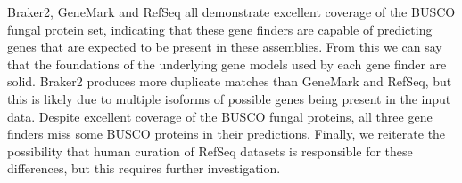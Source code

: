 
Braker2, GeneMark and RefSeq all demonstrate excellent coverage of the
BUSCO fungal protein set, indicating that these gene finders are
capable of predicting genes that are expected to be present in these
assemblies. From this we can say that the foundations of the
underlying gene models used by each gene finder are solid. Braker2
produces more duplicate matches than GeneMark and RefSeq, but this is
likely due to multiple isoforms of possible genes being present in the
input data. Despite excellent coverage of the BUSCO fungal proteins,
all three gene finders miss some BUSCO proteins in their
predictions. 
Finally, we reiterate the possibility that human curation of RefSeq datasets is responsible for these differences, but this requires further investigation.
